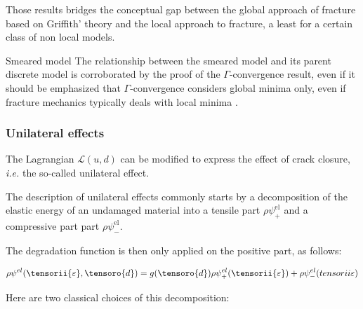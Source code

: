 Those results bridges the conceptual gap between the global approach of
fracture based on Griffith' theory and the local approach to fracture, a
least for a certain class of non local models.

\begin{infobox}{Smeared model}
    The relationship between the smeared model and its parent discrete
    model is corroborated by the proof of the $\Gamma$-convergence result,
    even if it should be emphasized that $\Gamma$-convergence considers
    global minima only, even if fracture mechanics typically deals
    with local minima \cite{freddi_regularized_2010}.
\end{infobox}

\subsubsection{Unilateral effects}
\label{unilateral_effects}

The Lagrangian $\mathcal{L}(u,d)$ can be modified to express the
effect of crack closure, \textit{i.e.} the so-called unilateral effect.

The description of unilateral effects commonly starts by a decomposition
of the elastic energy of an undamaged material into a tensile part
$\rho\psi^{\mathrm{el}}_{+}$ and a compressive part part
$\rho\psi^{\mathrm{el}}_{-}$.

The degradation function is then only applied on the positive part, as
follows:

\begin{equation}
    \rho \psi^{el}(\tensorii{\varepsilon}, \tensoro{d})
    =
    g(\tensoro{d}) \rho \psi^{el}_{+}(\tensorii{\varepsilon})
    +
    \rho \psi^{el}_{-}(tensorii{\varepsilon})
\end{equation}


Here are two classical choices of this decomposition:

